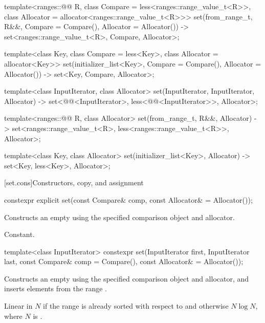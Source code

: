 \begin{codeblock}
{  template<ranges::@@ R, class Compare = less<ranges::range_value_t<R>>,
           class Allocator = allocator<ranges::range_value_t<R>>>
    set(from_range_t, R&&, Compare = Compare(), Allocator = Allocator())
      -> set<ranges::range_value_t<R>, Compare, Allocator>;

  template<class Key, class Compare = less<Key>, class Allocator = allocator<Key>>
    set(initializer_list<Key>, Compare = Compare(), Allocator = Allocator())
      -> set<Key, Compare, Allocator>;

  template<class InputIterator, class Allocator>
    set(InputIterator, InputIterator, Allocator)
      -> set<@@<InputIterator>,
             less<@@<InputIterator>>, Allocator>;

  template<ranges::@@ R, class Allocator>
    set(from_range_t, R&&, Allocator)
      -> set<ranges::range_value_t<R>, less<ranges::range_value_t<R>>, Allocator>;

  template<class Key, class Allocator>
    set(initializer_list<Key>, Allocator) -> set<Key, less<Key>, Allocator>;
}
\end{codeblock}%
%

[set.cons]{Constructors, copy, and assignment}

%
\begin{itemdecl}
constexpr explicit set(const Compare& comp, const Allocator& = Allocator());
\end{itemdecl}

\begin{itemdescr}
\pnum
\effects
Constructs an empty  using the specified comparison object and allocator.

\pnum
\complexity
Constant.
\end{itemdescr}

%
\begin{itemdecl}
template<class InputIterator>
  constexpr set(InputIterator first, InputIterator last,
                const Compare& comp = Compare(), const Allocator& = Allocator());
\end{itemdecl}

\begin{itemdescr}
\pnum
\effects
Constructs an empty
using the specified comparison object and allocator,
and inserts elements from the range
.

\pnum
\complexity
Linear in $N$ if the range
is already sorted with respect to 
and otherwise $N \log N$,
where $N$ is
.
\end{itemdescr}

